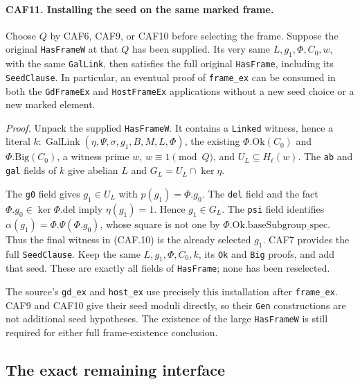 \documentclass[11pt,a4paper]{article}
\numberwithin{equation}{section}
\theoremstyle{remark}\newtheorem{remark}[theorem]{Remark}
\begin{document}
\paragraph{CAF11. Installing the seed on the same marked frame.}
\label{claim:CAF11}
Choose \(Q\) by CAF6, CAF9, or CAF10 before selecting the frame.
Suppose the original \texttt{Has\allowbreak Frame\allowbreak W} at that \(Q\) has been
supplied.  Its very same
\(L,g_1,\Phi,C_0,w\), with the same \texttt{Gal\allowbreak Link}, then
satisfies the full original \texttt{Has\allowbreak Frame}, including its
\texttt{Seed\allowbreak Clause}.  In particular, an eventual proof of
\texttt{frame\_\allowbreak ex} can be consumed in both the \texttt{Gd\allowbreak Frame\allowbreak Ex}
and \texttt{Host\allowbreak Frame\allowbreak Ex} applications without a new seed choice or
a new marked element.

\emph{Proof.}
Unpack the supplied \texttt{Has\allowbreak Frame\allowbreak W}.  It contains a
\texttt{Linked} witness, hence a literal
\(k:\operatorname{GalLink}(\eta,\Psi,\sigma,g_1,B,M,L,\Phi)\),
the existing \(\Phi.\mathrm{Ok}(C_0)\) and
\(\Phi.\mathrm{Big}(C_0)\), a witness prime \(w\),
\(w\equiv1\pmod Q\), and \(U_L\subseteq H_\ell(w)\).
The \texttt{ab} and \texttt{gal} fields of \(k\) give abelian
\(L\) and \(G_L=U_L\cap\ker\eta\).

The \texttt{g0} field gives \(g_1\in U_L\) with
\(p(g_1)=\Phi.g_0\).  The \texttt{del} field and the fact
\(\Phi.g_0\in\ker\Phi.\mathrm{del}\) imply
\(\eta(g_1)=1\).  Hence \(g_1\in G_L\).
The \texttt{psi} field identifies
\(\alpha(g_1)=\Phi.\Psi(\Phi.g_0)\), whose square is not one
by \(\Phi.\mathrm{Ok}.\mathrm{baseSubgroup\_\allowbreak spec}\).
Thus the final witness in (CAF.10) is the already selected \(g_1\).
CAF7 provides the full \texttt{Seed\allowbreak Clause}.  Keep the same
\(L,g_1,\Phi,C_0,k\), its \texttt{Ok} and \texttt{Big} proofs,
and add that seed.  These are exactly all fields of
\texttt{Has\allowbreak Frame}; none has been reselected.

The source's \texttt{gd\_\allowbreak ex} and \texttt{host\_\allowbreak ex} use precisely
this installation after \texttt{frame\_\allowbreak ex}.  CAF9 and CAF10 give
their seed moduli directly, so their \texttt{Gen} constructions are
not additional seed hypotheses.  The existence of the large
\texttt{Has\allowbreak Frame\allowbreak W} is still required for either full frame-existence
conclusion.

\subsection{The exact remaining interface}
\end{document}
